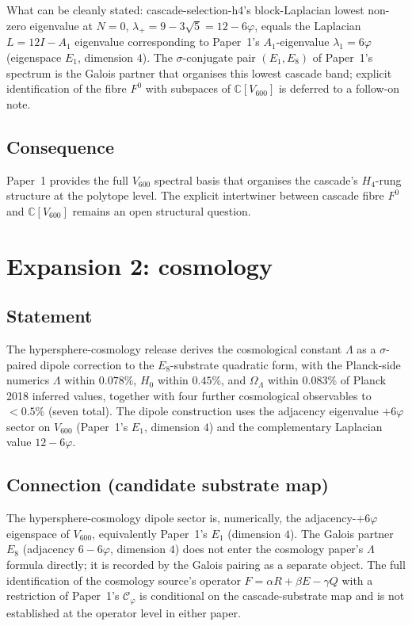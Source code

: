 \documentclass[11pt,a4paper]{article}
\theoremstyle{definition}
\theoremstyle{remark}
\newcommand{\C}{\mathbb{C}}
\newcommand{\CC}{\mathcal{C}}
\begin{document}
What can be cleanly stated: cascade-selection-h4's block-Laplacian
lowest non-zero eigenvalue at $N=0$,
$\lambda_+ = 9 - 3\sqrt 5 = 12 - 6\varphi$, equals the Laplacian
$L = 12 I - A_1$ eigenvalue corresponding to Paper~1's $A_1$-eigenvalue
$\lambda_1 = 6\varphi$ (eigenspace $E_1$, dimension $4$). The
$\sigma$-conjugate pair $(E_1, E_8)$ of Paper~1's spectrum is the
Galois partner that organises this lowest cascade band; explicit
identification of the fibre $F^0$ with subspaces of $\C[V_{600}]$ is
deferred to a follow-on note.

\subsection*{Consequence}

Paper~1 provides the full $V_{600}$ spectral basis that organises the
cascade's $H_4$-rung structure at the polytope level. The explicit
intertwiner between cascade fibre $F^0$ and $\C[V_{600}]$ remains an
open structural question.

\bigskip

\section{Expansion 2: cosmology}\label{sec:cosmology}

\subsection*{Statement}

The hypersphere-cosmology release \cite{hypersphereCosmology} derives
the cosmological constant $\Lambda$ as a $\sigma$-paired dipole
correction to the $E_8$-substrate quadratic form, with the Planck-side
numerics $\Lambda$ within $0.078\%$, $H_0$ within $0.45\%$, and
$\Omega_\Lambda$ within $0.083\%$ of Planck 2018 inferred values,
together with four further cosmological observables to $< 0.5\%$ (seven
total). The dipole construction uses the adjacency eigenvalue $+6\varphi$
sector on $V_{600}$ (Paper~1's $E_1$, dimension $4$) and the
complementary Laplacian value $12 - 6\varphi$.

\subsection*{Connection (candidate substrate map)}

The hypersphere-cosmology dipole sector is, numerically, the
adjacency-$+6\varphi$ eigenspace of $V_{600}$, equivalently Paper~1's
$E_1$ (dimension $4$). The Galois partner $E_8$ (adjacency $6 - 6\varphi$,
dimension $4$) does not enter the cosmology paper's $\Lambda$ formula
directly; it is recorded by the Galois pairing as a separate object.
The full identification of the cosmology source's operator
$F = \alpha R + \beta E - \gamma Q$ with a restriction of Paper~1's
$\CC_\varphi$ is conditional on the cascade-substrate map and is not
established at the operator level in either paper.
\end{document}
